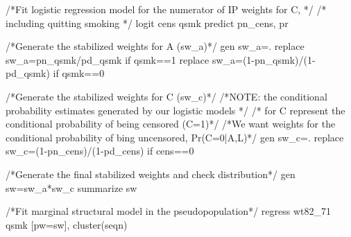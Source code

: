 \documentclass[
  10pt,
  a4paper,
]{book}
\newenvironment{Shaded}{\begin{snugshade}}{\end{snugshade}}
\newcommand{\AlertTok}[1]{\textcolor[rgb]{0.68,0.00,0.00}{#1}}
\newcommand{\CommentTok}[1]{\textcolor[rgb]{0.37,0.37,0.37}{#1}}
\newcommand{\KeywordTok}[1]{\textcolor[rgb]{0.00,0.46,0.62}{#1}}
\newcommand{\NormalTok}[1]{\textcolor[rgb]{0.00,0.46,0.62}{#1}}
\begin{document}
\begin{Shaded}
\begin{Highlighting}[]
\CommentTok{/*Fit logistic regression model for the  numerator of IP weights for C, */}
\CommentTok{/* including quitting smoking */}
\KeywordTok{logit}\NormalTok{ cens qsmk}
\KeywordTok{predict}\NormalTok{ pn\_cens, pr}

\CommentTok{/*Generate the stabilized weights for A (sw\_a)*/}
\KeywordTok{gen}\NormalTok{ sw\_a=.}
\KeywordTok{replace}\NormalTok{ sw\_a=pn\_qsmk/pd\_qsmk }\KeywordTok{if}\NormalTok{ qsmk==1}
\KeywordTok{replace}\NormalTok{ sw\_a=(1{-}pn\_qsmk)/(1{-}pd\_qsmk) }\KeywordTok{if}\NormalTok{ qsmk==0}

\CommentTok{/*Generate the stabilized weights for C (sw\_c)*/}
\CommentTok{/*}\AlertTok{NOTE}\CommentTok{: the conditional probability estimates generated by our logistic models */}
\CommentTok{/* for C represent the conditional probability of being censored (C=1)*/}
\CommentTok{/*We want weights for the conditional probability of bing uncensored, Pr(C=0|A,L)*/}
\KeywordTok{gen}\NormalTok{ sw\_c=.}
\KeywordTok{replace}\NormalTok{ sw\_c=(1{-}pn\_cens)/(1{-}pd\_cens) }\KeywordTok{if}\NormalTok{ cens==0}

\CommentTok{/*Generate the final stabilized weights and check distribution*/}
\KeywordTok{gen} \KeywordTok{sw}\NormalTok{=sw\_a*sw\_c}
\KeywordTok{summarize} \KeywordTok{sw}

\CommentTok{/*Fit marginal structural model in the pseudopopulation*/}
\KeywordTok{regress}\NormalTok{ wt82\_71 qsmk [pw=}\KeywordTok{sw}\NormalTok{], }\KeywordTok{cluster}\NormalTok{(seqn)}
\end{Highlighting}
\end{Shaded}
\end{document}
